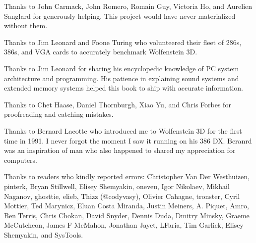 Thanks to John Carmack, John Romero, Romain Guy, Victoria Ho, and Aurelien Sanglard for generously helping. This project would have never
materialized without them.\\ 
\par
Thanks to  Jim Leonard and Foone Turing who volunteered their fleet of 286s, 386s, and VGA cards to accurately benchmark Wolfenstein 3D.\\
\par
Thanks to  Jim Leonard for sharing his encyclopedic knowledge of PC system architecture and programming. His patience in explaining sound systems and extended memory systems helped this book to ship with accurate information.\\
\par
Thanks to  Chet Haase, Daniel Thornburgh, Xiao Yu, and Chris Forbes for proofreading and catching mistakes.\\
\par
Thanks to Bernard Lacotte who introduced me to Wolfenstein 3D for the first time in 1991. I never forgot the moment I saw it running on his 386 DX. Beranrd was an inspiration of man who also happened to shared my appreciation for computers.\\
\par
Thanks to readers who kindly reported errors: Christopher Van Der Westhuizen, pinterk, Bryan Stillwell, Elisey Shemyakin, oneveu, Igor Nikolaev, Mikhail Naganov, ghosttie, elieb, Thizz (@codyvasy), Olivier Cahagne, tronster, Cyril Mottier, Ted Marynicz, Eluan Costa Miranda, Justin Meiners, A. Piquet, Amro, Ben Terris, Chris Chokan, David Snyder, Dennis Duda, Dmitry Minsky, Graeme McCutcheon, James F McMahon, Jonathan Jayet, LFaria, Tim Garlick, Elisey Shemyakin, and SysTools.\\
\par


\thispagestyle{plain} %
